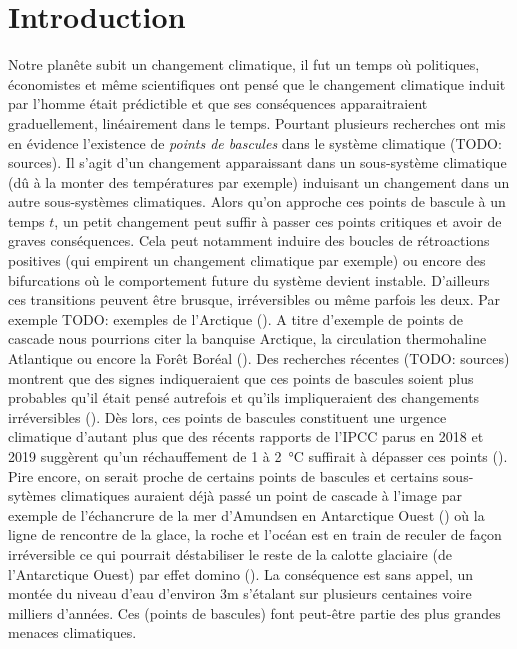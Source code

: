 \section{Introduction}

Notre planête subit un changement climatique, il fut un temps où politiques, économistes et même scientifiques ont pensé que le changement climatique induit par l'homme était prédictible et que ses conséquences apparaitraient graduellement, linéairement dans le temps. Pourtant plusieurs recherches ont mis en évidence l'existence de \emph{points de bascules} dans le système climatique (TODO: sources). Il s'agit d'un changement apparaissant dans un sous-système climatique (dû à la monter des températures par exemple) induisant un changement dans un autre sous-systèmes climatiques. Alors qu'on approche ces points de bascule à un temps $t$, un petit changement peut suffir à passer ces points critiques et avoir de graves conséquences. Cela peut notamment induire des boucles de rétroactions positives (qui empirent un changement climatique par exemple) ou encore des bifurcations où le comportement  future du système devient instable. D'ailleurs ces transitions peuvent être brusque, irréversibles ou même parfois les deux. Par exemple TODO: exemples de l'Arctique (\cite{Lenton_2012}). A titre d'exemple de points de cascade nous pourrions citer la banquise Arctique, la circulation thermohaline Atlantique ou encore la Forêt Boréal (\cite{lenton_tipping_2008}). Des recherches récentes (TODO: sources) montrent que des signes indiqueraient que ces points de bascules soient plus probables qu'il était pensé autrefois et qu'ils impliqueraient des changements irréversibles (\cite{lenton_climate_2019_too_risky}). Dès lors, ces points de bascules constituent une urgence climatique d'autant plus que des récents rapports de l'IPCC parus en 2018 et 2019 suggèrent qu'un réchauffement de 1 à \SI{2}{\celsius} suffirait à dépasser ces points (\cite{ipcc_global_2018,portner_ipcc_2019}). Pire encore, on serait proche de certains points de bascules et certains sous-sytèmes climatiques auraient déjà passé un point de cascade à l'image par exemple de l'échancrure de la mer d'Amundsen en Antarctique Ouest (\cite{portner_ipcc_2019}) où la ligne de rencontre de la glace, la roche et l'océan est en train de reculer de façon irréversible ce qui pourrait déstabiliser le reste de la calotte glaciaire (de l'Antarctique Ouest) par effet domino (\cite{feldmann_collapse_2015_amundsen}). La conséquence est sans appel, un montée du niveau d'eau d'environ 3m s'étalant sur plusieurs centaines voire milliers d'années. Ces (points de bascules) font peut-être partie des plus grandes menaces climatiques.

